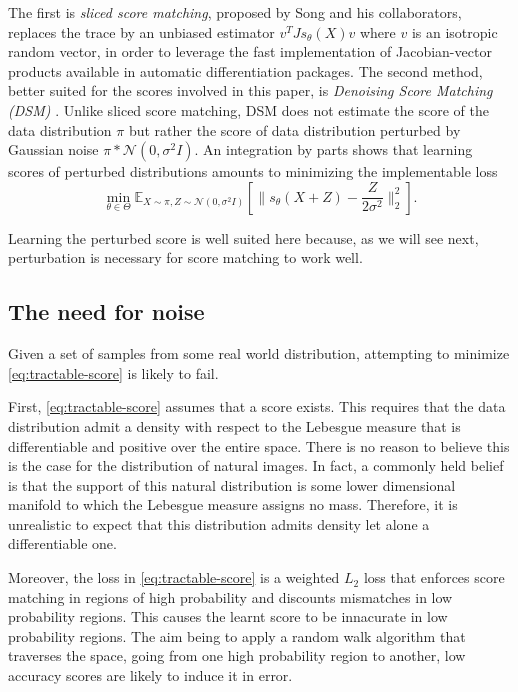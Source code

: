 \documentclass[11pt,twoside]{article}
\theoremstyle{definition}
\newcommand{\E}{\mathbb{E}}
\begin{document}
The first is \textit{sliced score matching}, proposed by Song and his collaborators, replaces the trace by an unbiased estimator $v^TJ{s_\theta}(X)v$ where $v$ is an isotropic random vector, in order to leverage the fast implementation of Jacobian-vector products available in automatic differentiation packages. The second method, better suited for the scores involved in this paper, is \textit{Denoising Score Matching (DSM)} \cite{vincent_connection_2011}. Unlike sliced score matching, DSM does not estimate the score of the data distribution $\pi$ but rather the score of data distribution perturbed by Gaussian noise $\pi * \mathcal{N}(0, \sigma^2I)$. An integration by parts shows that learning scores of perturbed distributions amounts to minimizing the implementable loss
\[
\min_{\theta \in \Theta} \E_{X \sim \pi, Z \sim \mathcal{N}(0, \sigma^2I)} \left[ \|s_\theta(X + Z) -  \frac{Z}{2\sigma^2}\|_2^2\right].
\]

Learning the perturbed score is well suited here because, as we will see next, perturbation is necessary for score matching to work well.

\subsection{The need for noise}
\label{sec:noise}

Given a set of samples from some real world distribution, attempting to minimize \eqref{eq:tractable-score} is likely to fail.

First, \eqref{eq:tractable-score} assumes that a score exists. This requires that the data distribution admit a density with respect to the Lebesgue measure that is differentiable and positive over the entire space. There is no reason to believe this is the case for the distribution of natural images. In fact, a commonly held belief is that the support of this natural distribution is some lower dimensional manifold to which the Lebesgue measure assigns no mass. Therefore, it is unrealistic to expect that this distribution admits density let alone a differentiable one.

Moreover, the loss in \eqref{eq:tractable-score} is a weighted $L_2$ loss that enforces score matching in regions of high probability and discounts mismatches in low probability regions. This causes the learnt score to be innacurate in low probability regions. The aim being to apply a random walk algorithm that traverses the space, going from one high probability region to another, low accuracy scores are likely to induce it in error. 
\end{document}
